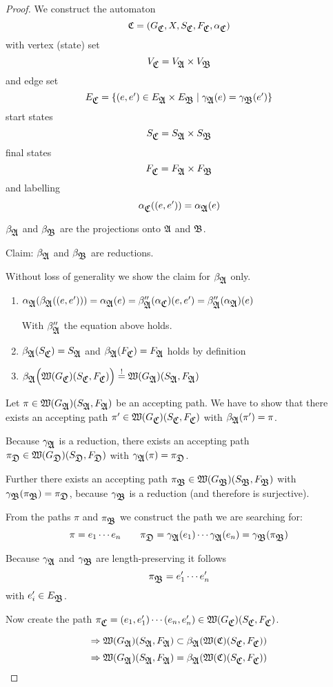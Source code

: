 \begin{proof}
We construct the automaton 
\[ \fa{C} = (G_{\fa{C}}, X, S_{\fa{C}}, F_{\fa{C}}, \alpha_{\fa{C}}) \]
with vertex (state) set
\[ V_{\fa{C}} = V_{\fa{A}} \times V_{\fa{B}} \]
and edge set
\[ E_{\fa{C}} = \setof{(e, e') \in E_{\fa{A}} \times E_{\fa{B}} \mid
\gamma_{\fa{A}}(e) = \gamma_{\fa{B}}(e')} \]
start states
\[ S_{\fa{C}} = S_{\fa{A}} \times S_{\fa{B}} \]
final states
\[ F_{\fa{C}} = F_{\fa{A}} \times F_{\fa{B}} \]
and labelling
\[ \alpha_{\fa{C}}((e, e')) = \alpha_{\fa{A}}(e) \] 

$\beta_{\fa{A}}$ and $\beta_{\fa{B}}$ are the projections onto $\fa{A}$ and
$\fa{B}$.

Claim: $\beta_{\fa{A}}$ and $\beta_{\fa{B}}$ are reductions.

Without loss of generality we show the claim for $\beta_{\fa{A}}$ only.

\begin{enumerate}
\item $\alpha_{\fa{A}}(\beta_{\fa{A}}((e,e'))) = \alpha_{\fa{A}}(e) =
\beta''_{\fa{A}}(\alpha_{\fa{C}})(e, e') = \beta''_{\fa{A}}(\alpha_{\fa{A}})(e)$

With $\beta''_{\fa{A}}$ the equation above holds.
\item $\beta_{\fa{A}}(S_{\fa{C}}) = S_{\fa{A}}$ and $\beta_{\fa{A}}(F_{\fa{C}})
= F_{\fa{A}}$ holds by definition
\item $\beta_{\fa{A}}\Big(\pathcat{G_{\fa{C}}}(S_{\fa{C}}, F_{\fa{C}})\Big)
\stackrel{!}{=} \pathcat{G_{\fa{A}}}(S_{\fa{A}}, F_{\fa{A}})$
\end{enumerate}

Let $\pi \in \pathcat{G_{\fa{A}}}(S_{\fa{A}}, F_{\fa{A}})$ be an accepting path.
We have to show that there exists an accepting path $\pi' \in
\pathcat{G_{\fa{C}}}(S_{\fa{C}}, F_{\fa{C}})$ with $\beta_{\fa{A}}(\pi') = \pi$.

Because $\gamma_{\fa{A}}$ is a reduction, there exists an accepting path
$\pi_{\fa{D}} \in \pathcat{G_{\fa{D}}}(S_{\fa{D}}, F_{\fa{D}})$ with
$\gamma_{\fa{A}}(\pi) = \pi_{\fa{D}}$.

Further there exists an accepting path $\pi_{\fa{B}} \in
\pathcat{G_{\fa{B}}}(S_{\fa{B}}, F_{\fa{B}})$ with
$\gamma_{\fa{B}}(\pi_{\fa{B}}) = \pi_{\fa{D}}$, because $\gamma_{\fa{B}}$ is a
reduction (and therefore is surjective).

From the paths $\pi$ and $\pi_{\fa{B}}$ we construct the path we are searching
for:
\[ \pi = e_1 \cdots e_n \qquad \pi_{\fa{D}} = \gamma_{\fa{A}}(e_1) \cdots
\gamma_{\fa{A}}(e_n) = \gamma_{\fa{B}}(\pi_{\fa{B}}) \]

Because $\gamma_{\fa{A}}$ and $\gamma_{\fa{B}}$ are length-preserving it follows
\[ \pi_{\fa{B}} = e'_1 \cdots e'_n \]
with $e'_i \in E_{\fa{B}}$.

Now create the path $\pi_{\fa{C}} = (e_1, e'_1) \cdots (e_n, e'_n) \in
\pathcat{G_{\fa{C}}}(S_{\fa{C}}, F_{\fa{C}})$.

\[ \Rightarrow \pathcat{G_{\fa{A}}}(S_{\fa{A}}, F_{\fa{A}}) \subset
\beta_{\fa{A}}(\pathcat{\fa{C}}(S_{\fa{C}}, F_{\fa{C}})) \]
\[ \Rightarrow \pathcat{G_{\fa{A}}}(S_{\fa{A}}, F_{\fa{A}}) =
\beta_{\fa{A}}(\pathcat{\fa{C}}(S_{\fa{C}}, F_{\fa{C}})) \]
\end{proof}

